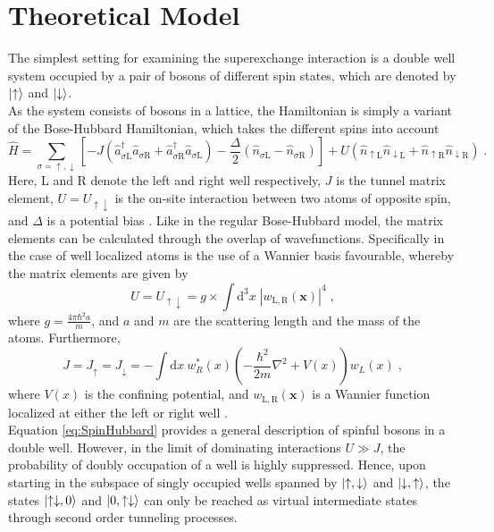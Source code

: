 \section{Theoretical Model}
The simplest setting for examining the superexchange interaction is a double well system occupied by a pair of bosons of different spin states, which are denoted by $\ket{\uparrow}$ and $\ket{\downarrow}$.\\
As the system consists of bosons in a lattice, the Hamiltonian is simply a variant of the Bose-Hubbard Hamiltonian, which takes the different spins into account
\begin{equation}
	\hat{H} = \sum_{\sigma = \uparrow , \downarrow} \left[ -J \left( \hat{a}_{\sigma \mathrm{L}}^{\dag} \hat{a}_{\sigma \mathrm{R}} + \hat{a}_{\sigma \mathrm{R}}^{\dag} \hat{a}_{\sigma \mathrm{L}} \right) - \frac{\Delta}{2} \left( \hat{n}_{\sigma \mathrm{L}} - \hat{n}_{\sigma \mathrm{R}} \right)   \right] + U \left( \hat{n}_{\uparrow \mathrm{L}} \hat{n}_{\downarrow \mathrm{L}} + \hat{n}_{\uparrow \mathrm{R}} \hat{n}_{\downarrow \mathrm{R}} \right) \; . \label{eq:SpinHubbard}
\end{equation}
Here, L and R denote the left and right well respectively, $J$ is the tunnel matrix element, $U = U_{\uparrow \downarrow}$ is the on-site interaction between two atoms of opposite spin, and $\Delta$ is a potential bias \cite{Trotzky2008}. Like in the regular Bose-Hubbard model, the matrix elements can be calculated through the overlap of wavefunctions. Specifically in the case of well localized atoms is the use of a Wannier basis favourable, whereby the matrix elements are given by 
\begin{equation}
	U = U_{\uparrow \downarrow} = g \times \int \mathrm{d}^3 x \; |w_{\mathrm{L},\mathrm{R}} (\boldsymbol{x})|^4 \; ,
\end{equation} 
where $g = \frac{4 \pi \hbar^2 a}{m}$, and $a$ and $m$ are the scattering length and the mass of the atoms. Furthermore,
\begin{equation}
	J = J_{\uparrow} = J_{\downarrow} = - \int \mathrm{d}x \ w_{R}^*(x) \left( - \frac{\hbar^2}{2 m} \nabla ^2 + V(x) \right) w_{L}(x) \; ,
\end{equation}
where $V(x)$ is the confining potential, and $w_{\mathrm{L},\mathrm{R}} (\boldsymbol{x})$ is a Wannier function localized at either the left or right well \cite{Kuklov2003}.\\
Equation \eqref{eq:SpinHubbard} provides a general description of spinful bosons in a double well. However, in the limit of dominating interactions $U \gg J$, the probability of doubly occupation of a well is highly suppressed. Hence, upon starting in the subspace of singly occupied wells spanned by $\ket{\uparrow,\downarrow}$ and $\ket{\downarrow,\uparrow}$, the states $\ket{\uparrow \downarrow, 0}$ and $\ket{0, \uparrow \downarrow}$ can only be reached as virtual intermediate states through second order tunneling processes.
